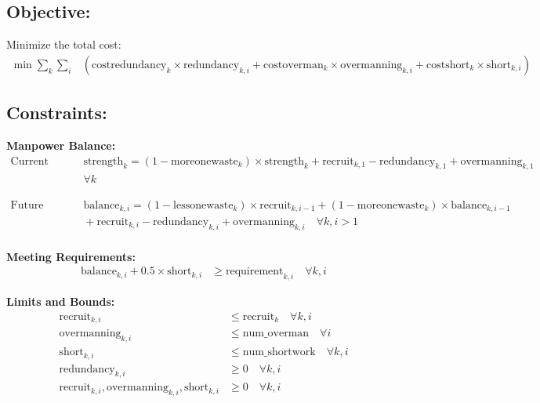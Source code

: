 \documentclass{article}
\begin{document}
\subsection*{Objective:}
Minimize the total cost:
\begin{align*}
\min \sum_{k} \sum_{i} & \left( \text{costredundancy}_k \times \text{redundancy}_{k,i} + \text{costoverman}_k \times \text{overmanning}_{k,i} + \text{costshort}_k \times \text{short}_{k,i} \right)
\end{align*}

\subsection*{Constraints:}

\noindent \textbf{Manpower Balance:}
\begin{align*}
\text{Current manpower balance: } 
& \quad \text{strength}_k = \left(1 - \text{moreonewaste}_k \right) \times \text{strength}_k + \text{recruit}_{k,1} - \text{redundancy}_{k,1} + \text{overmanning}_{k,1} \\
& \quad \forall k
\end{align*}

\begin{align*}
\text{Future manpower balance: }
& \quad \text{balance}_{k,i} = \left(1 - \text{lessonewaste}_k \right) \times \text{recruit}_{k,i-1} + \left(1 - \text{moreonewaste}_k \right) \times \text{balance}_{k,i-1} \\
& \quad + \text{recruit}_{k,i} - \text{redundancy}_{k,i} + \text{overmanning}_{k,i} \quad \forall k, i > 1 \\
\end{align*}

\noindent \textbf{Meeting Requirements:}
\begin{align*}
\text{balance}_{k,i} + 0.5 \times \text{short}_{k,i} & \geq \text{requirement}_{k,i} \quad \forall k, i
\end{align*}

\noindent \textbf{Limits and Bounds:}
\begin{align*}
\text{recruit}_{k,i} & \leq \text{recruit}_k \quad \forall k, i \\
\text{overmanning}_{k,i} & \leq \text{num\_overman} \quad \forall i \\
\text{short}_{k,i} & \leq \text{num\_shortwork} \quad \forall k, i \\
\text{redundancy}_{k,i} & \geq 0 \quad \forall k, i \\
\text{recruit}_{k,i}, \text{overmanning}_{k,i}, \text{short}_{k,i} & \geq 0 \quad \forall k, i \\
\end{align*}
\end{document}
